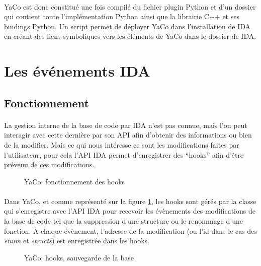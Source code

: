 \documentclass[11pt, book, english, french, standardlists]{upmethodology-document}
\begin{document}
			\paragraph*{}
				YaCo est donc constitué une fois compilé du fichier plugin Python  et d'un dossier qui contient toute l'implémentation Python ainsi que la librairie C++ et ses bindings Python. Un script permet de déployer YaCo dans l'installation de IDA en créant des liens symboliques vers les éléments de YaCo dans le dossier  de IDA.
		\section{Les événements IDA}
			\subsection{Fonctionnement}
				\paragraph*{}
					La gestion interne de la base de code par IDA n'est pas connue, mais l'on peut interagir avec cette dernière par son \gls{API} afin d'obtenir des informations ou bien de la modifier. Mais ce qui nous intéresse ce sont les modifications faites par l'utilisateur, pour cela l'\gls{API} IDA permet d'enregistrer des ``hooks'' afin d’être prévenu de ces modifications.
				\begin{figure}[H]
					\centering%
					\caption{YaCo: fonctionnement des hooks}%
					\label{fig:YaCo_hooks1}%
				\end{figure}
				\paragraph*{}
					Dans YaCo, et comme représenté sur la figure \ref{fig:YaCo_hooks1}, les hooks sont gérés par la classe  qui s'enregistre avec l'\gls{API} IDA pour recevoir les évènements des modifications de la base de code tel que la suppression d'une structure ou le renommage d'une fonction. À chaque évènement, l'adresse de la modification (ou l'id dans le cas des \textit{enum} et \textit{structs}) est enregistrée dans les hooks.
				\begin{figure}[H]
					\centering%
					\caption{YaCo: hooks, sauvegarde de la base}%
					\label{fig:YaCo_hooks2}%
				\end{figure}
\end{document}
